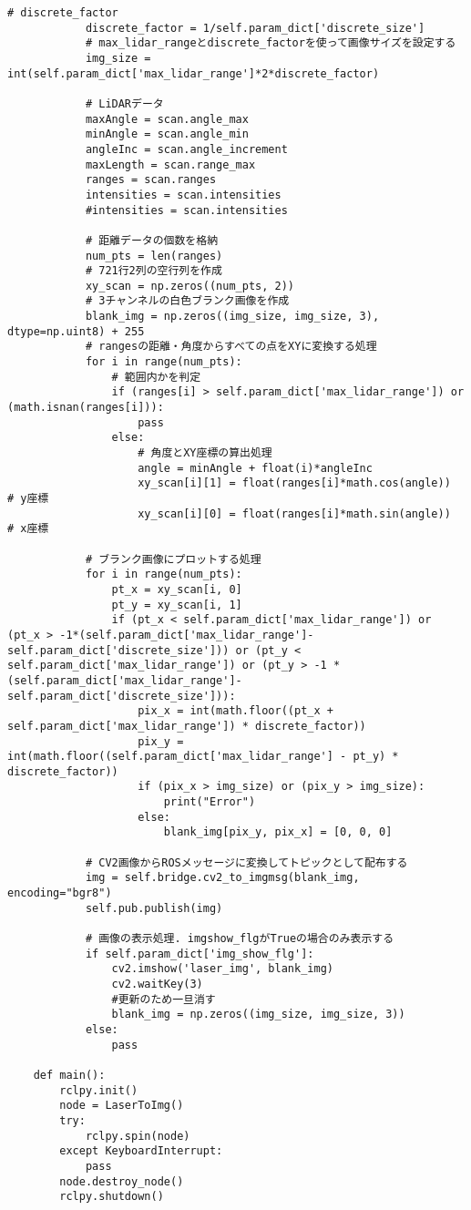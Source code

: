 \begin{lstlisting}[caption=laser\_to\_image.py, label=image]
            # discrete_factor
            discrete_factor = 1/self.param_dict['discrete_size']
            # max_lidar_rangeとdiscrete_factorを使って画像サイズを設定する
            img_size = int(self.param_dict['max_lidar_range']*2*discrete_factor)
    
            # LiDARデータ
            maxAngle = scan.angle_max
            minAngle = scan.angle_min
            angleInc = scan.angle_increment
            maxLength = scan.range_max
            ranges = scan.ranges
            intensities = scan.intensities
            #intensities = scan.intensities
            
            # 距離データの個数を格納
            num_pts = len(ranges)
            # 721行2列の空行列を作成
            xy_scan = np.zeros((num_pts, 2))
            # 3チャンネルの白色ブランク画像を作成
            blank_img = np.zeros((img_size, img_size, 3), dtype=np.uint8) + 255
            # rangesの距離・角度からすべての点をXYに変換する処理
            for i in range(num_pts):
                # 範囲内かを判定
                if (ranges[i] > self.param_dict['max_lidar_range']) or (math.isnan(ranges[i])):
                    pass
                else:
                    # 角度とXY座標の算出処理
                    angle = minAngle + float(i)*angleInc
                    xy_scan[i][1] = float(ranges[i]*math.cos(angle))  # y座標
                    xy_scan[i][0] = float(ranges[i]*math.sin(angle))  # x座標
    
            # ブランク画像にプロットする処理
            for i in range(num_pts):
                pt_x = xy_scan[i, 0]
                pt_y = xy_scan[i, 1]
                if (pt_x < self.param_dict['max_lidar_range']) or (pt_x > -1*(self.param_dict['max_lidar_range']-self.param_dict['discrete_size'])) or (pt_y < self.param_dict['max_lidar_range']) or (pt_y > -1 * (self.param_dict['max_lidar_range']-self.param_dict['discrete_size'])):
                    pix_x = int(math.floor((pt_x + self.param_dict['max_lidar_range']) * discrete_factor))
                    pix_y = int(math.floor((self.param_dict['max_lidar_range'] - pt_y) * discrete_factor))
                    if (pix_x > img_size) or (pix_y > img_size):
                        print("Error")
                    else:
                        blank_img[pix_y, pix_x] = [0, 0, 0]
    
            # CV2画像からROSメッセージに変換してトピックとして配布する
            img = self.bridge.cv2_to_imgmsg(blank_img, encoding="bgr8")
            self.pub.publish(img)
    
            # 画像の表示処理. imgshow_flgがTrueの場合のみ表示する
            if self.param_dict['img_show_flg']:
                cv2.imshow('laser_img', blank_img)
                cv2.waitKey(3)
                #更新のため一旦消す
                blank_img = np.zeros((img_size, img_size, 3))
            else:
                pass
    
    def main():
        rclpy.init()
        node = LaserToImg()
        try:
            rclpy.spin(node)
        except KeyboardInterrupt:
            pass
        node.destroy_node()
        rclpy.shutdown()
\end{lstlisting}

